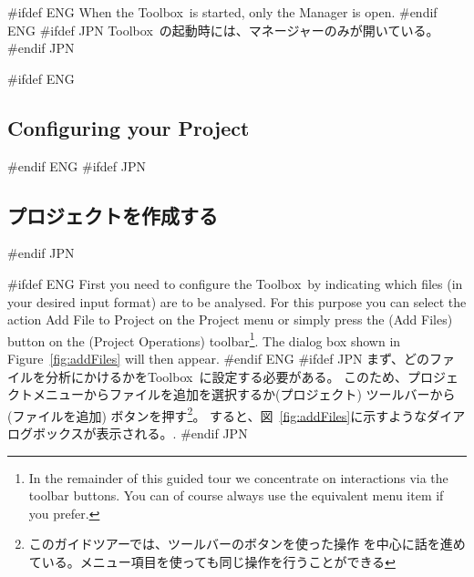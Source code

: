 \documentclass[\pformat,12pt]{article}
\newcommand{\Toolbox}{Toolbox}
\newcommand{\Toolbox}{Toolbox}
\newcommand{\guicmd}[1]{{\sf #1}}
\newcommand{\guicmd}[1]{{\gt #1}}
\begin{document}
#ifdef ENG
When the \Toolbox\ is started, only the \guicmd{Manager} is open.
#endif ENG
#ifdef JPN
\Toolbox\ の起動時には、\guicmd{マネージャー}のみが開いている。
#endif JPN

#ifdef ENG
\subsection{Configuring your Project}
#endif ENG
#ifdef JPN
\subsection{プロジェクトを作成する}
#endif JPN

#ifdef ENG
First you need to configure the \Toolbox\ by indicating which 
files (in your desired input format) are to be analysed. For this
purpose you can select the action \guicmd{Add File to Project} on the
\guicmd{Project} menu or simply press the 
(\guicmd{Add Files}) button on the (\guicmd{Project Operations})
toolbar\footnote{In the remainder of this guided tour we concentrate
  on interactions via the toolbar buttons. You can of course always
  use the equivalent menu item if you prefer.}. The dialog box shown
in Figure~\ref{fig:addFiles} will then appear.
#endif ENG
#ifdef JPN
まず、どのファイルを分析にかけるかを\Toolbox\ に設定する必要がある。
このため、プロジェクトメニューから\guicmd{ファイルを追加}を選択するか(\guicmd{プロジェクト})
ツールバーから  
(\guicmd{ファイルを追加}) ボタンを押す\footnote{このガイドツアーでは、ツールバーのボタンを使った操作
を中心に話を進めている。メニュー項目を使っても同じ操作を行うことができる}。
すると、図~\ref{fig:addFiles}に示すようなダイアログボックスが表示される。.
#endif JPN
\end{document}
